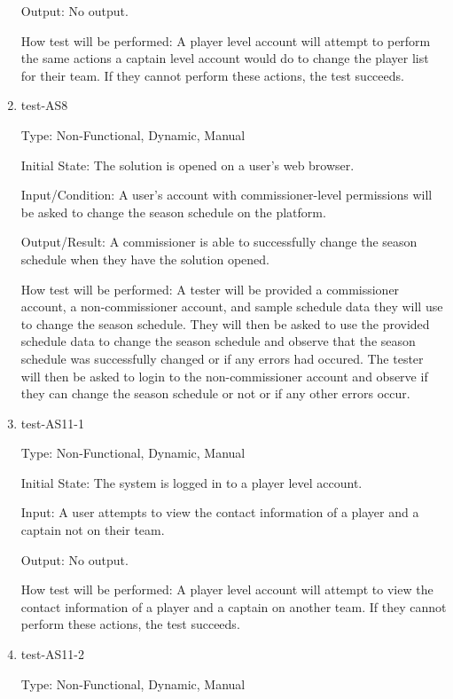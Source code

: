 \documentclass[12pt, titlepage]{article}
\begin{document}
\begin{enumerate}
  Output: No output.

  How test will be performed: A player level account will attempt to perform
  the same actions a captain level account would do to change the player list
  for their team. If they cannot perform these actions, the test succeeds.

  \item{test-AS8\\}
  
  Type: Non-Functional, Dynamic, Manual
            
  Initial State: The solution is opened on a user's web browser.
            
  Input/Condition: A user's account with commissioner-level permissions will be asked to
  change the season schedule on the platform.
            
  Output/Result: A commissioner is able to successfully change the season schedule
  when they have the solution opened.
            
  How test will be performed: A tester will be provided a commissioner account, a
  non-commissioner account, and sample schedule data they will use to change the season
  schedule. They will then be asked to use the provided schedule data to change the season
  schedule and observe that the season schedule was successfully changed or if any errors
  had occured. The tester will then be asked to login to the non-commissioner account and
  observe if they can change the season schedule or not or if any other errors occur.

  \item{test-AS11-1\\}

  Type: Non-Functional, Dynamic, Manual

  Initial State: The system is logged in to a player level account.

  Input: A user attempts to view the contact information of a player and
  a captain not on their team.

  Output: No output.

  How test will be performed: A player level account will attempt to view the
  contact information of a player and a captain on another team. If they
  cannot perform these actions, the test succeeds.

  \item{test-AS11-2\\}

  Type: Non-Functional, Dynamic, Manual


\end{enumerate}
\end{document}
